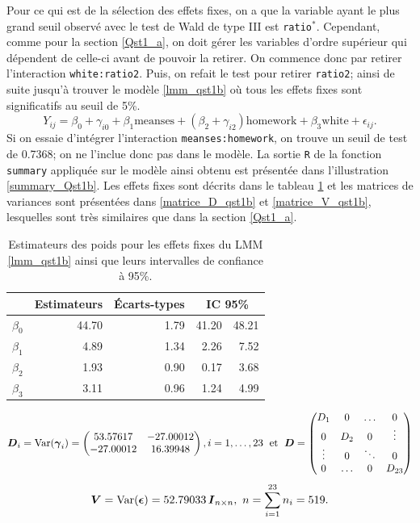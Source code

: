 \documentclass{article}
\begin{document}
		Pour ce qui est de la sélection des effets fixes, on a que la variable ayant le plus grand seuil observé avec le test de Wald de type III est \texttt{ratio}$^*$. Cependant, comme pour la section \ref{Qst1_a}, on doit gérer les variables d'ordre supérieur qui dépendent de celle-ci avant de pouvoir la retirer. On commence donc par retirer l'interaction \texttt{white:ratio2}. Puis, on refait le test pour retirer \texttt{ratio2}; ainsi de suite jusqu'à trouver le modèle \eqref{lmm_qst1b} où tous les effets fixes sont significatifs au seuil de 5\%.
		\begin{equation}\label{lmm_qst1b}
			Y_{ij} = \beta_0 + \gamma_{i0} + \beta_1 \mathrm{meanses} + (\beta_2 + \gamma_{i2}) \mathrm{homework} + \beta_3\mathrm{white} + \epsilon_{ij}.
		\end{equation}
		Si on essaie d'intégrer l'interaction \texttt{meanses:homework}, on trouve un seuil de test de 0.7368; on ne l'inclue donc pas dans le modèle.		
		La sortie \texttt{R} de la fonction \texttt{summary} appliquée sur le modèle ainsi obtenu est présentée dans l'illustration \ref{summary_Qst1b}. Les effets fixes sont décrits dans le tableau \ref{tbl_effets_fixes_qst1b} et les matrices de variances sont présentées dans \eqref{matrice_D_qst1b} et \eqref{matrice_V_qst1b}, lesquelles sont très similaires que dans la section \ref{Qst1_a}.
		\begin{table}[ht]
			\centering
			\begin{tabular}{lrrrr}
				\hline
				& Estimateurs & Écarts-types &  \multicolumn{2}{c}{IC 95\%} \\ 
				\hline
				$\beta_0$ & 44.70 & 1.79 & 41.20 & 48.21 \\ 
				$\beta_1$ & 4.89 & 1.34 & 2.26 & 7.52 \\ 
				$\beta_2$ & 1.93 & 0.90 & 0.17 & 3.68 \\ 
				$\beta_3$ & 3.11 & 0.96 & 1.24 & 4.99 \\ 
				\hline
			\end{tabular}
		\caption{Estimateurs des poids pour les effets fixes du LMM \eqref{lmm_qst1b} ainsi que leurs intervalles de confiance à 95\%.}
		\label{tbl_effets_fixes_qst1b}
		\end{table}
		\begin{align}\label{matrice_D_qst1b}
			\boldsymbol{D}_i = \mathrm{Var}(\boldsymbol{\gamma}_i) = 
			\begin{pmatrix}
				53.57617 & -27.00012 \\
				-27.00012& 16.39948  \\
			\end{pmatrix},
			i=1,\dots,23
			\; \text{ et }\;
			\boldsymbol{D} = 
			\begin{pmatrix}
				D_1 & 0 & \dots & 0 \\
				0 & D_2 & 0 & \vdots \\
				\vdots & 0 & \ddots & 0 \\
				0 & \dots & 0 & D_{23}
			\end{pmatrix}
		\end{align}
		\begin{align}\label{matrice_V_qst1b}
			\boldsymbol{V} = \mathrm{Var}(\boldsymbol{\epsilon}) = 
			52.79033\, \boldsymbol{I}_{n\times n},
			\ n=\sum_{i=1}^{23} n_i = 519.
		\end{align}
\end{document}

